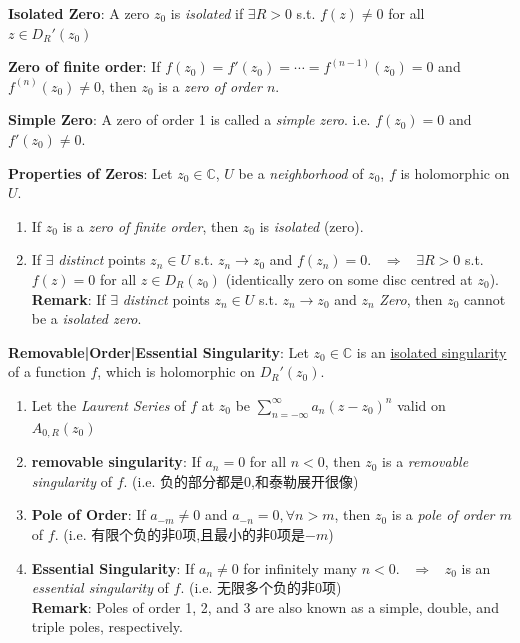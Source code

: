 \documentclass[9pt]{article}
\begin{document}
\textbf{Isolated Zero}: {\small A zero $z_0$ is \textit{isolated} if $\exists R>0$ s.t. $f(z)\ne 0$ for all $z\in D_{R}'(z_0)$}

\textbf{Zero of finite order}: {\small If $f(z_0)=f'(z_0)=\cdots=f^{(n-1)}(z_0)=0$ and $f^{(n)}(z_0)\ne 0$, then $z_0$ is a \textit{zero of order $n$}.}

\textbf{Simple Zero}: {\small A zero of order 1 is called a \textit{simple zero}. {\scriptsize i.e. $f(z_0)=0$ and $f'(z_0)\ne 0$.}}

\textbf{Properties of Zeros}: Let $z_0\in\mathbb{C}$, $U$ be a \textit{neighborhood} of $z_0$, $f$ is holomorphic on $U$.

\begin{enumerate}[itemsep=-2pt, topsep=-2pt]
    \item If $z_0$ is a \textit{zero of finite order}, then $z_0$ is \textit{isolated} {\footnotesize (zero)}.
    \item If $\exists$ \textit{distinct} points $z_n\in U$ s.t. $z_n\to z_0$ and $f(z_n)=0$. \ $\Rightarrow$ \ $\exists R>0$ s.t. $f(z)=0$ for all $z\in D_{R}(z_0)$ {\tiny (identically zero on some disc centred at $z_0$)}. \\
    \textbf{Remark}: If $\exists$ \textit{distinct} points $z_n\in U$ s.t. $z_n\to z_0$ and $z_n$ \textit{Zero}, then $z_0$ cannot be a \textit{isolated zero}.
\end{enumerate}

\textbf{Removable|Order|Essential Singularity}: Let $z_0\in\mathbb{C}$ is an \underline{isolated singularity} of a function $f$, which is holomorphic on $D_{R}'(z_0)$.

\begin{enumerate}[itemsep=-2pt, topsep=-2pt]
    \item Let the \textit{Laurent Series} of $f$ at $z_0$ be $\sum^\infty_{n=-\infty}a_n(z-z_0)^n$ \qquad valid on $A_{0,R}(z_0)$
    \item \textbf{removable singularity}: If $a_n=0$ for all $n<0$, then $z_0$ is a \textit{removable singularity} of $f$. {\scriptsize (i.e. 负的部分都是0,和泰勒展开很像)}
    \item \textbf{Pole of Order}: If $a_{-m}\ne0$ and $a_{-n}=0,\forall n>m$, then $z_0$ is a \textit{pole of order $m$} of $f$.  {\scriptsize (i.e. 有限个负的非0项,且最小的非0项是$-m$)}
    \item \textbf{Essential Singularity}: If $a_n\ne0$ for infinitely many $n<0$. \ $\Rightarrow$ \ $z_0$ is an \textit{essential singularity} of $f$. {\scriptsize (i.e. 无限多个负的非0项)} \\
    \textbf{Remark}: Poles of order 1, 2, and 3 are also known as a simple, double, and triple poles, respectively.
\end{enumerate}
\end{document}
